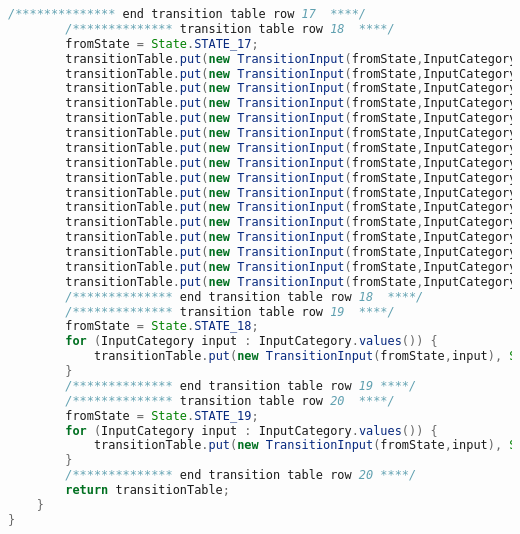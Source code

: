 \begin{lstlisting}[basicstyle=\miniscule,language=Java,caption=Implementation of transition table,label=listing:transition table]
		/************** end transition table row 17  ****/
		/************** transition table row 18  ****/
		fromState = State.STATE_17;
		transitionTable.put(new TransitionInput(fromState,InputCategory.LETTER), State.STATE_ERROR);
		transitionTable.put(new TransitionInput(fromState,InputCategory.DIGIT), State.STATE_ERROR);
		transitionTable.put(new TransitionInput(fromState,InputCategory.UNDERSCORE), State.STATE_ERROR);
		transitionTable.put(new TransitionInput(fromState,InputCategory.SLASH_DIVIDE), State.STATE_ERROR);
		transitionTable.put(new TransitionInput(fromState,InputCategory.ASTERISK), State.STATE_ERROR);
		transitionTable.put(new TransitionInput(fromState,InputCategory.LESS_THAN), State.STATE_ERROR);
		transitionTable.put(new TransitionInput(fromState,InputCategory.GREATER_THAN), State.STATE_ERROR);
		transitionTable.put(new TransitionInput(fromState,InputCategory.PLUS), State.STATE_ERROR);
		transitionTable.put(new TransitionInput(fromState,InputCategory.HYPHEN_MINUS), State.STATE_ERROR);
		transitionTable.put(new TransitionInput(fromState,InputCategory.EQUAL), State.STATE_19);
		transitionTable.put(new TransitionInput(fromState,InputCategory.EXCLAMATION_MARK), State.STATE_ERROR);
		transitionTable.put(new TransitionInput(fromState,InputCategory.DOT), State.STATE_ERROR);
		transitionTable.put(new TransitionInput(fromState,InputCategory.SINGLE_QUOTE), State.STATE_ERROR);
		transitionTable.put(new TransitionInput(fromState,InputCategory.PUNCT), State.STATE_ERROR);
		transitionTable.put(new TransitionInput(fromState,InputCategory.OTHER_PRINTABLE), State.STATE_ERROR);
		transitionTable.put(new TransitionInput(fromState,InputCategory.LINE_FEED), State.STATE_ERROR);
		/************** end transition table row 18  ****/
		/************** transition table row 19  ****/
		fromState = State.STATE_18;
		for (InputCategory input : InputCategory.values()) {
			transitionTable.put(new TransitionInput(fromState,input), State.STATE_ERROR);
		}
		/************** end transition table row 19 ****/
		/************** transition table row 20  ****/
		fromState = State.STATE_19;
		for (InputCategory input : InputCategory.values()) {
			transitionTable.put(new TransitionInput(fromState,input), State.STATE_ERROR);
		}
		/************** end transition table row 20 ****/	
		return transitionTable;
	}
}
\end{lstlisting}

